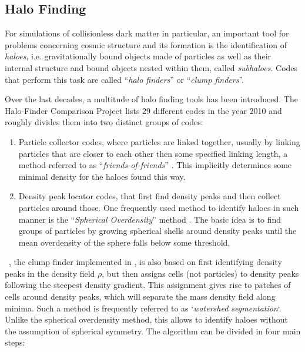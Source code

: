 \subsection{Halo Finding}

For simulations of collisionless dark matter in particular, an important tool for problems concerning cosmic structure and its formation is the identification of \emph{haloes}, i.e. gravitationally bound objects made of particles as well as their internal structure and bound objects nested within them, called \emph{subhaloes}. 
Codes that perform this task are called ``\emph{halo finders}'' or ``\emph{clump finders}''.


Over the last decades, a multitude of halo finding tools has been introduced.
The Halo-Finder Comparison Project \parencite{MAD} lists 29 different codes in the year 2010 and roughly divides them into two distinct groups of codes:
%
\begin{enumerate}
	\item Particle collector codes, where particles are linked together, usually by linking particles that are closer to each other then some specified linking length, a method referred to as ``\emph{friends-of-friends}'' \parencite{FOF}.
	This implicitly determines some minimal density for the haloes found this way.
	\item Density peak locator codes, that first find density peaks and then collect particles around those.
	One frequently used method to identify haloes in such manner is the ``\emph{Spherical Overdensity}'' method \parencite{SO}. 
	The basic idea is to find groups of particles by growing spherical shells around density peaks until the mean overdensity of the sphere falls below some threshold.
\end{enumerate}
%

\phew\ \parencite{PHEW}, the clump finder implemented in \ramses, is also based on first identifying density peaks in the density field $\rho$, but then assigns cells (not particles) to density peaks following the steepest density gradient.
This assignment gives rise to patches of cells around density peaks, which will separate the mass density field along minima.
Such a method is frequently referred to as `\emph{watershed segmentation}`.
Unlike the spherical overdensity method, this allows to identify haloes without the assumption of spherical symmetry.
The algorithm can be divided in four main steps: 

